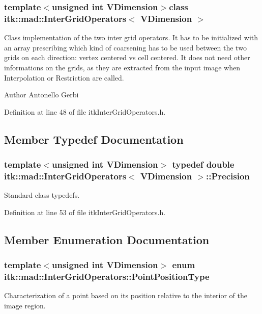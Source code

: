 \subsubsection*{template$<$unsigned int V\-Dimension$>$class itk\-::mad\-::\-Inter\-Grid\-Operators$<$ V\-Dimension $>$}

Class implementation of the two inter grid operators. It has to be initialized with an array prescribing which kind of coarsening has to be used between the two grids on each direction\-: vertex centered vs cell centered. It does not need other informations on the grids, as they are extracted from the input image when Interpolation or Restriction are called. 

\begin{DoxyAuthor}{Author}
Antonello Gerbi 
\end{DoxyAuthor}


Definition at line 48 of file itk\-Inter\-Grid\-Operators.\-h.



\subsection{Member Typedef Documentation}
\hypertarget{classitk_1_1mad_1_1_inter_grid_operators_ade61ab9b171ac4b689489cb14d3bde7d}{
\subsubsection[{Precision}]{\setlength{\rightskip}{0pt plus 5cm}template$<$unsigned int V\-Dimension$>$ typedef double {\bf itk\-::mad\-::\-Inter\-Grid\-Operators}$<$ V\-Dimension $>$\-::{\bf Precision}}}\label{classitk_1_1mad_1_1_inter_grid_operators_ade61ab9b171ac4b689489cb14d3bde7d}
Standard class typedefs. 

Definition at line 53 of file itk\-Inter\-Grid\-Operators.\-h.



\subsection{Member Enumeration Documentation}
\hypertarget{classitk_1_1mad_1_1_inter_grid_operators_a7dfcf280f70ae36e4860d8d962f4a05d}{
\subsubsection[{Point\-Position\-Type}]{\setlength{\rightskip}{0pt plus 5cm}template$<$unsigned int V\-Dimension$>$ enum {\bf itk\-::mad\-::\-Inter\-Grid\-Operators\-::\-Point\-Position\-Type}}}\label{classitk_1_1mad_1_1_inter_grid_operators_a7dfcf280f70ae36e4860d8d962f4a05d}
Characterization of a point based on its position relative to the interior of the image region. 

